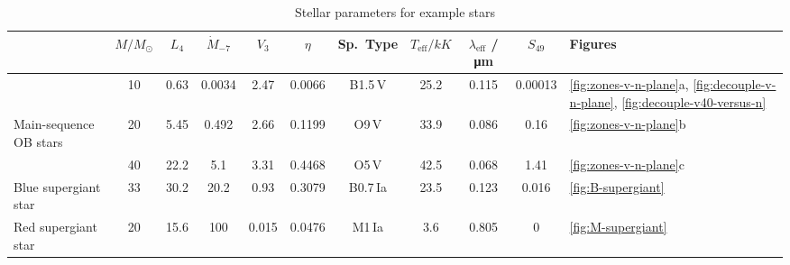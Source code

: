 \begin{table}
  \centering
  \caption{Stellar parameters for example stars}
  \label{tab:stars}
  \begin{tabular}{l S S S S S S S S S l}
    \toprule
    & {\(M / \si{M_\odot}\)} & {\(L_4\)}
    & {\(\dot{M}_{-7}\)} & {\(V_3\)} & {\( \eta \)}
    & {Sp.~Type} 
    & {\(T_{\text{eff}} / \si{kK}\)} & {\(\lambda_{\text{eff}}\) / \si{\um}}
    & {\(S_{49}\)} & Figures 
    \\
    \midrule
    & 10 & 0.63 & 0.0034 & 2.47 & 0.0066 & {B1.5\,V} & 25.2 & 0.115 & 0.00013
                   & \ref{fig:zones-v-n-plane}a,
                     \ref{fig:decouple-v-n-plane},
                     \ref{fig:decouple-v40-versus-n} \\
    Main-sequence OB stars
    & 20 & 5.45 & 0.492 & 2.66 & 0.1199 & {O9\,V} & 33.9 & 0.086 & 0.16
                   & \ref{fig:zones-v-n-plane}b\\
    & 40 & 22.2 & 5.1 & 3.31 & 0.4468 & {O5\,V} & 42.5 & 0.068 & 1.41
                   & \ref{fig:zones-v-n-plane}c\\[\smallskipamount]
    Blue supergiant star
    & 33 & 30.2 & 20.2 & 0.93 & 0.3079 & {B0.7\,Ia} & 23.5 & 0.123 & 0.016
                   & \ref{fig:B-supergiant} \\[\smallskipamount]
    Red supergiant star
    & 20 & 15.6 & 100 & 0.015 & 0.0476 & {M1\,Ia} & 3.6 & 0.805 & 0
                   & \ref{fig:M-supergiant} \\ 
    \bottomrule
  \end{tabular}
\end{table}

